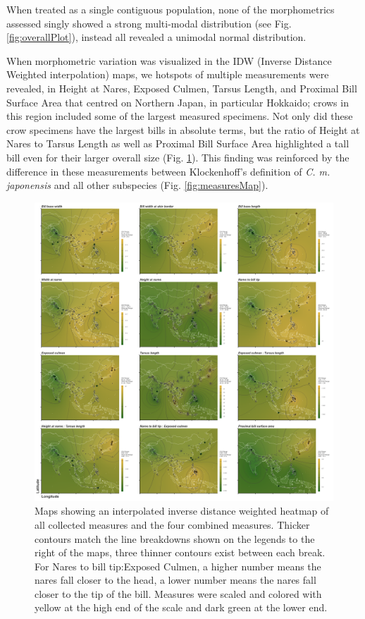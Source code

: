 \documentclass[10pt,a4paper]{article}
\begin{document}
When treated as a single contiguous population, none of the morphometrics assessed singly showed a strong multi-modal distribution (see Fig. \ref{fig:overallPlot}), instead all revealed a unimodal normal distribution.

When morphometric variation was visualized in the IDW (Inverse Distance Weighted interpolation) maps, we hotspots of multiple measurements were revealed, in Height at Nares, Exposed Culmen, Tarsus Length, and Proximal Bill Surface Area that centred on Northern Japan, in particular Hokkaido; crows in this region included some of the largest measured specimens.
Not only did these crow specimens have the largest bills in absolute terms, but the ratio of Height at Nares to Tarsus Length as well as Proximal Bill Surface Area highlighted a tall bill even for their larger overall size (Fig. \ref{fig:idwMaps}).
This finding was reinforced by the difference in these measurements between Klockenhoff's definition of \emph{C. m. japonensis} and all other subspecies (Fig. \ref{fig:measuresMap}).

\begin{figure}
\includegraphics[width=0.9\linewidth]{../Figures/IDWmaps} \caption{Maps showing an interpolated inverse distance weighted heatmap of all collected measures and the four combined measures. Thicker contours match the line breakdowns shown on the legends to the right of the maps, three thinner contours exist between each break. For Nares to bill tip:Exposed Culmen, a higher number means the nares fall closer to the head, a lower number means the nares fall closer to the tip of the bill. Measures were scaled and colored with yellow at the high end of the scale and dark green at the lower end.}\label{fig:idwMaps}
\end{figure}
\end{document}
